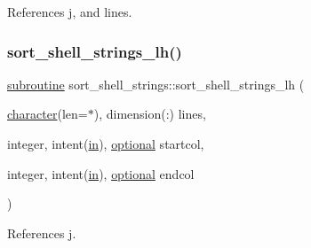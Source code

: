 References j, and lines.

\mbox{\label{M__sort_8f90_a4a1eed2e76f3429d7eb5cd2ae5b50fa1}} 
\subsubsection{\texorpdfstring{sort\+\_\+shell\+\_\+strings\+\_\+lh()}{sort\_shell\_strings\_lh()}}
{\footnotesize\ttfamily \hyperlink{M__stopwatch_83_8txt_acfbcff50169d691ff02d4a123ed70482}{subroutine} sort\+\_\+shell\+\_\+strings\+::sort\+\_\+shell\+\_\+strings\+\_\+lh (\begin{DoxyParamCaption}\item[{\hyperlink{option__stopwatch_83_8txt_abd4b21fbbd175834027b5224bfe97e66}{character}(len=$\ast$), dimension(\+:)}]{lines,  }\item[{integer, intent(\hyperlink{M__journal_83_8txt_afce72651d1eed785a2132bee863b2f38}{in}), \hyperlink{option__stopwatch_83_8txt_aa4ece75e7acf58a4843f70fe18c3ade5}{optional}}]{startcol,  }\item[{integer, intent(\hyperlink{M__journal_83_8txt_afce72651d1eed785a2132bee863b2f38}{in}), \hyperlink{option__stopwatch_83_8txt_aa4ece75e7acf58a4843f70fe18c3ade5}{optional}}]{endcol }\end{DoxyParamCaption})\hspace{0.3cm}{\ttfamily [private]}}



References j.

